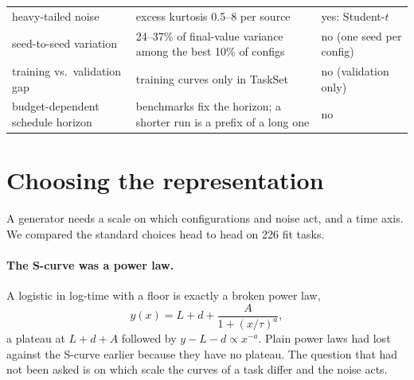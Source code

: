 \documentclass[10pt]{article}
\begin{document}
\begin{table}[t]
\begin{tabular}{p{3.7cm}p{6.8cm}p{4.0cm}}
heavy-tailed noise & excess kurtosis 0.5--8 per source & yes: Student-$t$ \\
seed-to-seed variation & 24--37\% of final-value variance among the best 10\% of configs & no (one seed per config) \\
training vs.\ validation gap & training curves only in TaskSet & no (validation only) \\
budget-dependent schedule horizon & benchmarks fix the horizon; a shorter run is a prefix of a long one & no \\
\bottomrule
\end{tabular}
\end{table}

\section{Choosing the representation}
\label{sec:representation}

A generator needs a scale on which configurations and noise act, and a time axis. We compared the standard choices
head to head on 226 fit tasks.

\paragraph{The S-curve was a power law.} A logistic in log-time with a floor is exactly a broken power law,
\begin{equation}
  y(x) = L + d + \frac{A}{1 + (x/\tau)^{a}},
  \label{eq:bpl}
\end{equation}
a plateau at $L + d + A$ followed by $y - L - d \propto x^{-a}$. Plain power laws had lost against the S-curve
earlier because they have no plateau. The question that had not been asked is on which scale the curves of a task
differ and the noise acts.
\end{document}
